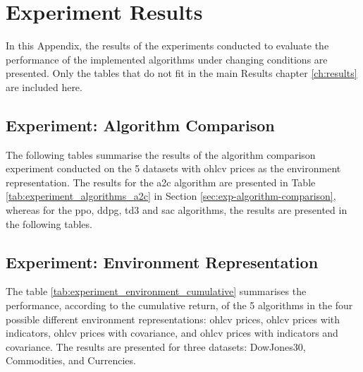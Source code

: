 \chapter{Experiment Results}

In this Appendix, the results of the experiments conducted to evaluate the performance of the implemented algorithms under changing conditions are presented. Only the tables that do not fit in the main Results chapter \ref{ch:results} are included here.

\section{Experiment: Algorithm Comparison} \label{app:experiment_algorithms_comparison}

The following tables summarise the results of the algorithm comparison experiment conducted on the 5 datasets with \acrshort{ohlcv} prices as the environment representation. The results for the \acrshort{a2c} algorithm are presented in Table \ref{tab:experiment_algorithms_a2c} in Section \ref{sec:exp-algorithm-comparison}, whereas for the \acrshort{ppo}, \acrshort{ddpg}, \acrshort{td3} and \acrshort{sac} algorithms, the results are presented in the following tables. 

% 

% 

% 

% 

\section{Experiment: Environment Representation} \label{app:experiment_environment_representation}

The table \ref{tab:experiment_environment_cumulative} summarises the performance, according to the cumulative return, of the 5 algorithms in the four possible different environment representations: \acrshort{ohlcv} prices, \acrshort{ohlcv} prices with indicators, \acrshort{ohlcv} prices with covariance, and \acrshort{ohlcv} prices with indicators and covariance. The results are presented for three datasets: DowJones30, Commodities, and Currencies. 


